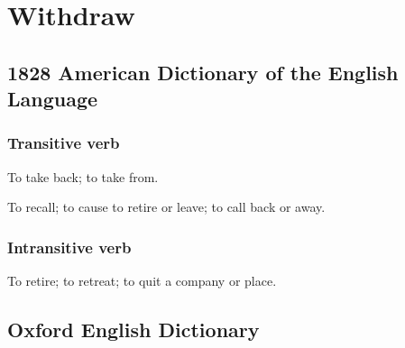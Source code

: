 \section{Withdraw}
	\label{WITHDRAW}
	

\subsection{1828 American Dictionary of the English Language} %
	\label{WITHDRAW-1828}
	
	\subsubsection{Transitive verb}

		\begin{compactitem}
			\item[1] To take back; to take from.
			\item[2] To recall; to cause to retire or leave; to call back or away.
		\end{compactitem}
		
	\subsubsection{Intransitive verb}

		\begin{compactitem}
			\item To retire; to retreat; to quit a company or place. 
		\end{compactitem}

\subsection{Oxford English Dictionary} %
	\label{WITHDRAW-OED}

